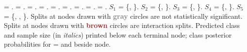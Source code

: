 \documentclass{article}
\begin{document}
\begin{landscape}
\texttt{} = \texttt{}.
\texttt{} = \texttt{}.
\texttt{} = \texttt{}.
\texttt{} = \texttt{}.
\texttt{} = \texttt{}.
\texttt{} = \texttt{}.
\texttt{} = \texttt{}.
\texttt{} = \texttt{}.
\texttt{} = \texttt{}.
 $S_{1}$ = \{\texttt{}, \texttt{}\}.
 $S_{2}$ = \{\texttt{}, \texttt{}\}.
 $S_{3}$ = \{\texttt{}, \texttt{}\}.
 $S_{4}$ = \{\texttt{}, \texttt{}\}.
 $S_{5}$ = \{\texttt{}, \texttt{},
 \texttt{}\}.
 Splits at nodes drawn with \textbf{\textcolor{gray}{gray}} circles are not statistically significant.
 Splits at nodes drawn with \textbf{\textcolor{brown}{brown}} circles are interaction splits.
Predicted class and sample size (in \emph{italics}) printed below each terminal node;
class posterior probabilities for \texttt{} =
 \texttt{} and \texttt{} beside node.
 \end{landscape}
 
\end{document}

